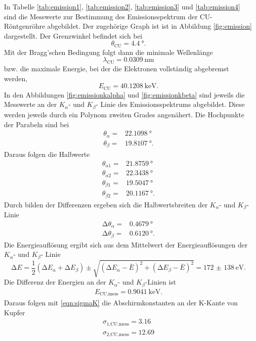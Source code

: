 In Tabelle \ref{tab:emission1}, \ref{tab:emission2}, \ref{tab:emission3} und
\ref{tab:emission4} sind die Messwerte zur Bestimmung des
Emissionsspektrum der CU-Röntgenröhre abgebildet. Der zugehörige Graph ist
ist in Abbildung \ref{fig:emission} dargestellt.
Der Grenzwinkel befindet sich bei
\begin{equation}
  \theta_\text{CU} = \SI{4.4}{\degree}.
\end{equation}
Mit der Bragg'schen Bedingung folgt dann die minimale Wellenlänge
\begin{equation}
  \lambda_\text{CU} = \SI{0.0309}{\nano\meter}
\end{equation}
bzw. die maximale Energie, bei der die Elektronen vollständig abgebremst werden,
\begin{equation}
  E_\text{CU} = \SI{40.1208}{\kilo\electronvolt}.
\end{equation}
In den Abbildungen \ref{fig:emissionkalpha} und \ref{fig:emissionkbeta} sind
jeweils die Messwerte an der $K_\alpha$- und $K_\beta$- Linie des
Emissionsspektrums abgebildet. Diese werden jeweils durch ein Polynom zweiten
Grades angenähert.
Die Hochpunkte der Parabeln sind bei
\begin{align}
  \theta_\alpha = & \SI{22.1098}{\degree} \\
  \theta_\beta = & \SI{19.8107}{\degree}.
\end{align}
Daraus folgen die Halbwerte
\begin{align}
  \theta_{\alpha 1} = & \SI{21.8759}{\degree} \\
  \theta_{\alpha 2} = & \SI{22.3438}{\degree} \\
  \theta_{\beta 1} = & \SI{19.5047}{\degree} \\
  \theta_{\beta 2} = & \SI{20.1167}{\degree}.
\end{align}
Durch bilden der Differenzen ergeben sich die Halbwertsbreiten der
$K_\alpha$- und $K_\beta$- Linie
\begin{align}
  \increment \theta_\alpha = & \SI{0.4679}{\degree} \\
  \increment \theta_\beta = & \SI{0.6120}{\degree}.
\end{align}
Die Energieauflösung ergibt sich aus dem Mittelwert der Energieauflösungen
der $K_\alpha$- und $K_\beta$- Linie
\begin{equation}
  \increment E = \frac{1}{2}(\increment E_\alpha + \increment E_\beta) \pm
  \sqrt{(\increment E_\alpha - \bar{E})^2 + (\increment E_\beta - \bar{E})^2}
  = \SI{172(138)}{\electronvolt}.
\end{equation}
Die Differenz der Energien an der $K_\alpha$- und $K_\beta$-Linien ist
\begin{align}
  E_\text{CU,mess} = \SI{0.9041}{\kilo\electronvolt}.
\end{align}
Daraus folgen mit \eqref{eqn:sigmaK}
die Abschirmkonstanten an der K-Kante von Kupfer
\begin{align}
  \sigma_\text{1,CU,mess} = 3.16 \\
  \sigma_\text{2,CU,mess} = 12.69
\end{align}


